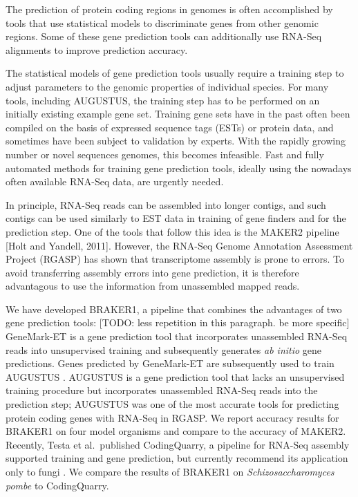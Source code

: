 \documentclass{bioinfo}
\begin{document}
The prediction of protein coding regions in genomes is often accomplished by tools that use statistical models to discriminate genes from other genomic regions. Some of these gene prediction tools can additionally use RNA-Seq alignments to improve prediction accuracy.

The statistical models of gene prediction tools usually require a training  step to adjust parameters to the genomic properties of individual species. For many tools, including AUGUSTUS, the training step has to be performed on an initially existing example gene set. Training gene sets have in the past often been compiled on the basis of expressed sequence tags (ESTs) or protein data, and sometimes have been subject to validation by experts. With the rapidly growing number or novel sequences genomes, this becomes infeasible. Fast and fully automated methods for training gene prediction tools, ideally using the nowadays often available RNA-Seq data, are urgently needed.

In principle, RNA-Seq reads can be assembled into longer contigs, and such contigs can be used similarly to EST data in training of gene finders and for the prediction step. One of the tools that follow this idea is the MAKER2 pipeline [Holt and Yandell, 2011]. However, the RNA-Seq Genome Annotation Assessment Project (RGASP) \cite{RGASP} has shown that transcriptome assembly is prone to errors. To avoid transferring assembly errors into gene prediction, it is therefore advantagous to use the information from unassembled mapped reads.

We have developed BRAKER1, a pipeline that combines the advantages of two gene prediction tools: [TODO: less repetition in this paragraph. be more specific] GeneMark-ET \cite{GeneMark-ET} is a gene prediction tool that incorporates unassembled RNA-Seq reads into unsupervised training and subsequently generates \textit{ab initio} gene predictions.  Genes predicted by GeneMark-ET are subsequently used to train AUGUSTUS \cite{AUGUSTUS}. AUGUSTUS is a gene prediction tool that lacks an unsupervised training procedure but incorporates unassembled RNA-Seq reads into the prediction step; AUGUSTUS was one of the most accurate tools for predicting protein coding genes with RNA-Seq in RGASP. We report accuracy results for BRAKER1 on four model organisms and compare to the accuracy of MAKER2. Recently, Testa et al.~published CodingQuarry, a pipeline for RNA-Seq assembly supported training and gene prediction, but currently recommend its application only to fungi \cite{CodingQuarry}. We compare the results of BRAKER1 on \textit{Schizosaccharomyces pombe} to CodingQuarry.
\end{document}

